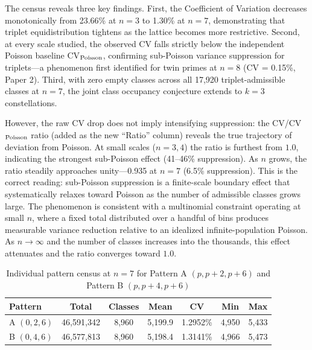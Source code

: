 \documentclass[11pt]{article}
\begin{document}
The census reveals three key findings. First, the Coefficient of Variation decreases monotonically from 23.66\% at $n=3$ to 1.30\% at $n=7$, demonstrating that triplet equidistribution tightens as the lattice becomes more restrictive. Second, at every scale studied, the observed CV falls strictly below the independent Poisson baseline CV$_{\rm Poisson}$, confirming sub-Poisson variance suppression for triplets---a phenomenon first identified for twin primes at $n=8$ (CV = 0.15\%, Paper 2). Third, with zero empty classes across all 17{,}920 triplet-admissible classes at $n=7$, the joint class occupancy conjecture extends to $k=3$ constellations.

However, the raw CV drop does not imply intensifying suppression: the CV/CV$_{\rm Poisson}$ ratio (added as the new ``Ratio'' column) reveals the true trajectory of deviation from Poisson. At small scales ($n=3,4$) the ratio is furthest from $1.0$, indicating the strongest sub-Poisson effect (41--46\% suppression). As $n$ grows, the ratio steadily approaches unity---0.935 at $n=7$ (6.5\% suppression). This is the correct reading: sub-Poisson suppression is a finite-scale boundary effect that systematically relaxes toward Poisson as the number of admissible classes grows large. The phenomenon is consistent with a multinomial constraint operating at small $n$, where a fixed total distributed over a handful of bins produces measurable variance reduction relative to an idealized infinite-population Poisson. As $n \to \infty$ and the number of classes increases into the thousands, this effect attenuates and the ratio converges toward $1.0$.

\begin{table}[h]
\centering
\caption{Individual pattern census at $n=7$ for Pattern A $(p, p+2, p+6)$ and Pattern B $(p, p+4, p+6)$}
\label{tab:triplet_split}
\begin{tabular}{lcccccc}
\toprule
Pattern & Total & Classes & Mean & CV & Min & Max \\
\midrule
A $(0, 2, 6)$ & 46{,}591{,}342 & 8{,}960 & 5{,}199.9 & 1.2952\% & 4{,}950 & 5{,}433 \\
B $(0, 4, 6)$ & 46{,}577{,}813 & 8{,}960 & 5{,}198.4 & 1.3141\% & 4{,}966 & 5{,}473 \\
\bottomrule
\end{tabular}

\vspace{0.5em}
\end{table}
\end{document}
